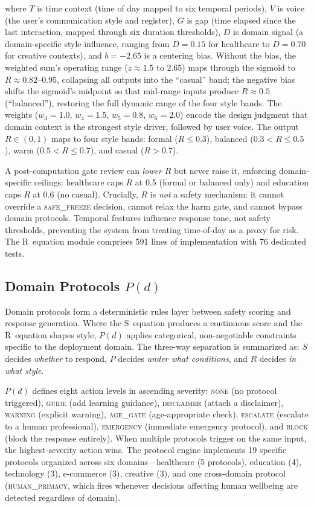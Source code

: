 \documentclass[11pt,a4paper]{article}
\begin{document}
\noindent where $T$ is time context (time of day mapped to six temporal periods), $V$ is voice (the user's communication style and register), $G$ is gap (time elapsed since the last interaction, mapped through six duration thresholds), $D$ is domain signal (a domain-specific style influence, ranging from $D = 0.15$ for healthcare to $D = 0.70$ for creative contexts), and $b = -2.65$ is a centering bias. Without the bias, the weighted sum's operating range ($z \approx 1.5$ to $2.65$) maps through the sigmoid to $R \approx 0.82$--$0.95$, collapsing all outputs into the ``casual'' band; the negative bias shifts the sigmoid's midpoint so that mid-range inputs produce $R \approx 0.5$ (``balanced''), restoring the full dynamic range of the four style bands. The weights ($w_3 = 1.0$, $w_4 = 1.5$, $w_5 = 0.8$, $w_6 = 2.0$) encode the design judgment that domain context is the strongest style driver, followed by user voice. The output $R \in (0,1)$ maps to four style bands: formal ($R \leq 0.3$), balanced ($0.3 < R \leq 0.5$), warm ($0.5 < R \leq 0.7$), and casual ($R > 0.7$).

A post-computation gate review can \emph{lower} $R$ but never raise it, enforcing domain-specific ceilings: healthcare caps $R$ at 0.5 (formal or balanced only) and education caps $R$ at 0.6 (no casual). Crucially, $R$ is \emph{not} a safety mechanism: it cannot override a \textsc{safe\_freeze} decision, cannot relax the harm gate, and cannot bypass domain protocols. Temporal features influence response tone, not safety thresholds, preventing the system from treating time-of-day as a proxy for risk. The R~equation module comprises 591 lines of implementation with 76 dedicated tests.


\subsection{Domain Protocols $P(d)$}
\label{sec:protocols}

Domain protocols form a deterministic rules layer between safety scoring and response generation. Where the S~equation produces a continuous score and the R~equation shapes style, $P(d)$ applies categorical, non-negotiable constraints specific to the deployment domain. The three-way separation is summarized as: $S$ decides \emph{whether} to respond, $P$ decides \emph{under what conditions}, and $R$ decides \emph{in what style}.

$P(d)$ defines eight action levels in ascending severity: \textsc{none} (no protocol triggered), \textsc{guide} (add learning guidance), \textsc{disclaimer} (attach a disclaimer), \textsc{warning} (explicit warning), \textsc{age\_gate} (age-appropriate check), \textsc{escalate} (escalate to a human professional), \textsc{emergency} (immediate emergency protocol), and \textsc{block} (block the response entirely). When multiple protocols trigger on the same input, the highest-severity action wins. The protocol engine implements 19 specific protocols organized across six domains---healthcare (5 protocols), education (4), technology (3), e-commerce (3), creative (3), and one cross-domain protocol (\textsc{human\_primacy}, which fires whenever decisions affecting human wellbeing are detected regardless of domain).
\end{document}

